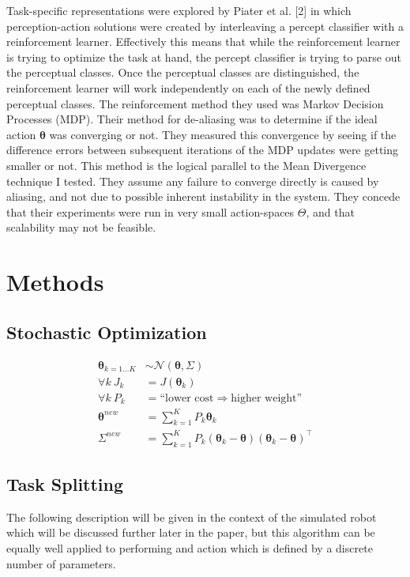\documentclass[12pt]{article}
\newcommand{\actsp}{\Theta}
\newcommand{\act}{\bm{\theta}}
\begin{document}
Task-specific representations were explored by Piater et al. [2] in which perception-action solutions were created by interleaving a percept classifier with a reinforcement learner. Effectively this means that while the reinforcement learner is trying to optimize the task at hand, the percept classifier is trying to parse out the perceptual classes. Once the perceptual classes are distinguished, the reinforcement learner will work independently on each of the newly defined perceptual classes. The reinforcement method they used was Markov Decision Processes (MDP). Their method for de-aliasing was to determine if the ideal action $\act$ was converging or not. They measured this convergence by seeing if the difference errors between subsequent iterations of the MDP updates were getting smaller or not. This method is the logical parallel to the Mean Divergence technique I tested. They assume any failure to converge directly is caused by aliasing, and not due to possible inherent instability in the system. They concede that their experiments were run in very small action-spaces $\actsp$, and that scalability may not be feasible. 


\section{Methods}
\subsection{Stochastic Optimization}

\begin{align*}
\act_{k=1\dots K} & {\sim}\mathcal{N}({\act},{\Sigma})\\
\forall k~J_k & = J(\act_k)\\
\forall k~P_k & = \mbox{``lower cost} \Rightarrow \mbox{higher weight''}\\
\act^{new} & = \sum_{k=1}^{K} P_k \act_k\\
\Sigma^{new} & = \sum_{k=1}^{K}P_k(\act_k-\act)(\act_k-\act)^\intercal
\end{align*}


\subsection{Task Splitting}
The following description will be given in the context of the simulated robot which will be discussed further later in the paper, but this algorithm can be equally well applied to performing and action which is defined by a discrete number of parameters. 
\end{document}
